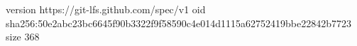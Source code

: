 version https://git-lfs.github.com/spec/v1
oid sha256:50e2abc23bc6645f90b3322f9f58590c4e014d1115a62752419bbe22842b7723
size 368
